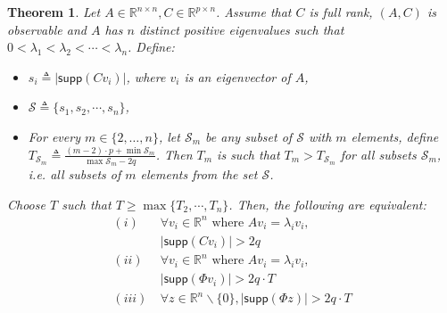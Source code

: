 \documentclass[12pt, conference, a4paper, twoside]{IEEEconf_mod}
\newtheorem{thm}{\bf{Theorem}}
\begin{document}

\begin{thm} Let $A \in \mathbb{R}^{n\times n}, C \in \mathbb{R}^{p\times n}$. Assume that $C$ is full rank, $(A,C)$ is observable and $A$ has $n$ distinct positive eigenvalues such that $0 < \lambda_1 < \lambda_2 < \cdots < \lambda_n$. %
Define:
\begin{itemize}
\item
$s_i \triangleq \lvert \textsf{supp} (Cv_i) \vert$, where $v_i$ is an eigenvector of $A$, %
\item
$\mathcal{S} \triangleq \{ s_1, s_2, \cdots, s_n \}$,
\item
For every $m \in \{2, \ldots, n\}$, let $\mathcal{S}_m$ be any subset of $\mathcal{S}$ with $m$ elements, define $T_{\mathcal{S}_m} \triangleq \frac {  (m-2) \cdot p + \min \mathcal{S}_m } {\max \mathcal{S}_m - 2q }$.
Then $T_m$ is such that $T_m > T_{\mathcal{S}_m}$ for all subsets $\mathcal{S}_m$, i.e. all subsets of $m$ elements from the set $\mathcal{S}$.
\end{itemize}
Choose $T$ such that  $T \ge \max \{ T_2, \cdots, T_n \}$.
Then, the following are equivalent:
\begin{equation}
\begin{aligned} 
 (i)  &~\forall v_i \in \mathbb{R}^n \text{ where } Av_i =\lambda_i v_i, \\
 	&~ \lvert \textsf{supp}(Cv_i) \rvert > 2q  \\
  (ii)  &~\forall v_i \in \mathbb{R}^n \text{ where } Av_i =\lambda_i v_i,  \\
  	&~\lvert \textsf{supp} (\Phi v_i) \rvert > 2q \cdot T  \\
  (iii) &~  \forall z \in \mathbb{R}^n\backslash \{0 \}, \lvert \textsf{supp} (\Phi z) \rvert > 2 q \cdot T\\
  \nonumber 
\label{eq:new_condition}
\end{aligned}
\end{equation}
\end{thm}
\noindent
\end{document}
